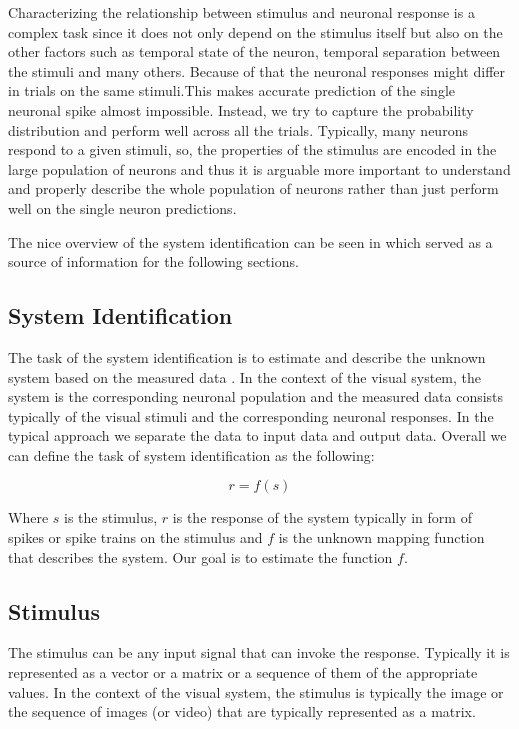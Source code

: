 Characterizing the relationship between stimulus and neuronal response is a complex
task since it does not only depend on the stimulus itself but also on the other 
factors such as temporal state of the neuron, temporal separation between the stimuli
and many others. Because of that the neuronal responses might differ in trials on 
the same stimuli.This makes accurate prediction of the single neuronal spike almost 
impossible. Instead, we try to capture the probability distribution and perform well 
across all the trials. Typically, many neurons respond to a given stimuli, so, 
the properties of the stimulus are encoded in the large population of neurons and thus 
it is arguable more important to understand and properly describe the whole 
population of neurons rather than just perform well on the single neuron predictions.

The nice overview of the system identification can be seen in 
\citet{annurev:/content/journals/10.1146/annurev-vision-091718-014731} which served as
a source of information for the following sections.

\subsection{System Identification}
\label{subsec:system_identification}
The task of the system identification is to estimate and describe the unknown system 
based on the measured data 
\citet{annurev:/content/journals/10.1146/annurev-vision-091718-014731}. 
In the context of the visual system, the system is the
corresponding neuronal population and the measured data consists typically of the visual 
stimuli and the corresponding neuronal responses. In the typical approach we 
separate the data to input data and output data. Overall we can define the task of 
system identification as the following:

\begin{equation}
    r = f(s)
    \label{eq:system_identification}
\end{equation}

Where $s$ is the stimulus, $r$ is the response of the system typically in form of 
spikes or spike trains on the stimulus and 
$f$ is the unknown mapping function that describes the system. Our goal is to 
estimate the function $f$.

\subsection{Stimulus}
\label{subsec:stimulus}
The stimulus can be any input signal that can invoke the response. Typically it is 
represented as a vector or a matrix or a sequence of them of the appropriate values. 
In the context of the visual system, the stimulus is typically the image or the 
sequence of images (or video) that are typically represented as a matrix.

